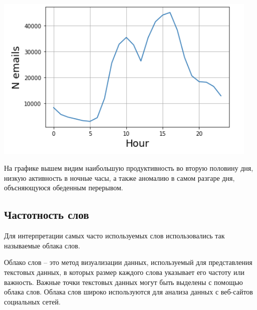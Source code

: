 \begin{itemize}
$ $

\includegraphics[scale=0.8]{pics/enron_hour.png}

На графике вышем видим наибольшую продуктивность во вторую половину дня, низкую активность в ночные часы, а также аномалию в самом разгаре дня, объсняющуюся обеденным перерывом.

\end{itemize}

\subsection{Частотность слов}

Для интерпретации самых часто используемых слов использовались так называемые облака слов.

Облако слов -- это метод визуализации данных, используемый для представления текстовых данных, в которых размер каждого слова указывает его частоту или важность. Важные точки текстовых данных могут быть выделены с помощью облака слов. Облака слов широко используются для анализа данных с веб-сайтов социальных сетей.


